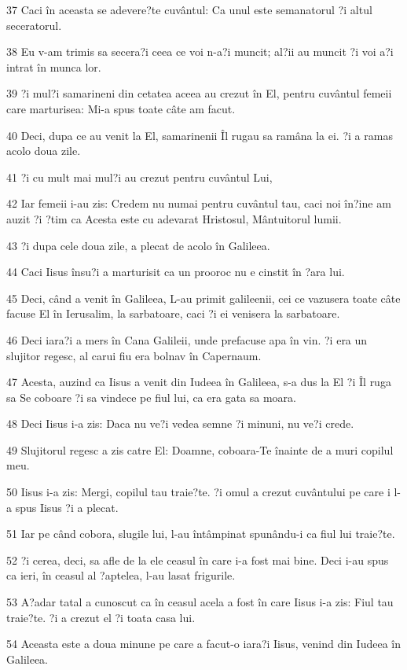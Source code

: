 \par 37 Caci în aceasta se adevere?te cuvântul: Ca unul este semanatorul ?i altul seceratorul.
\par 38 Eu v-am trimis sa secera?i ceea ce voi n-a?i muncit; al?ii au muncit ?i voi a?i intrat în munca lor.
\par 39 ?i mul?i samarineni din cetatea aceea au crezut în El, pentru cuvântul femeii care marturisea: Mi-a spus toate câte am facut.
\par 40 Deci, dupa ce au venit la El, samarinenii Îl rugau sa ramâna la ei. ?i a ramas acolo doua zile.
\par 41 ?i cu mult mai mul?i au crezut pentru cuvântul Lui,
\par 42 Iar femeii i-au zis: Credem nu numai pentru cuvântul tau, caci noi în?ine am auzit ?i ?tim ca Acesta este cu adevarat Hristosul, Mântuitorul lumii.
\par 43 ?i dupa cele doua zile, a plecat de acolo în Galileea.
\par 44 Caci Iisus însu?i a marturisit ca un prooroc nu e cinstit în ?ara lui.
\par 45 Deci, când a venit în Galileea, L-au primit galileenii, cei ce vazusera toate câte facuse El în Ierusalim, la sarbatoare, caci ?i ei venisera la sarbatoare.
\par 46 Deci iara?i a mers în Cana Galileii, unde prefacuse apa în vin. ?i era un slujitor regesc, al carui fiu era bolnav în Capernaum.
\par 47 Acesta, auzind ca Iisus a venit din Iudeea în Galileea, s-a dus la El ?i Îl ruga sa Se coboare ?i sa vindece pe fiul lui, ca era gata sa moara.
\par 48 Deci Iisus i-a zis: Daca nu ve?i vedea semne ?i minuni, nu ve?i crede.
\par 49 Slujitorul regesc a zis catre El: Doamne, coboara-Te înainte de a muri copilul meu.
\par 50 Iisus i-a zis: Mergi, copilul tau traie?te. ?i omul a crezut cuvântului pe care i l-a spus Iisus ?i a plecat.
\par 51 Iar pe când cobora, slugile lui, l-au întâmpinat spunându-i ca fiul lui traie?te.
\par 52 ?i cerea, deci, sa afle de la ele ceasul în care i-a fost mai bine. Deci i-au spus ca ieri, în ceasul al ?aptelea, l-au lasat frigurile.
\par 53 A?adar tatal a cunoscut ca în ceasul acela a fost în care Iisus i-a zis: Fiul tau traie?te. ?i a crezut el ?i toata casa lui.
\par 54 Aceasta este a doua minune pe care a facut-o iara?i Iisus, venind din Iudeea în Galileea.

